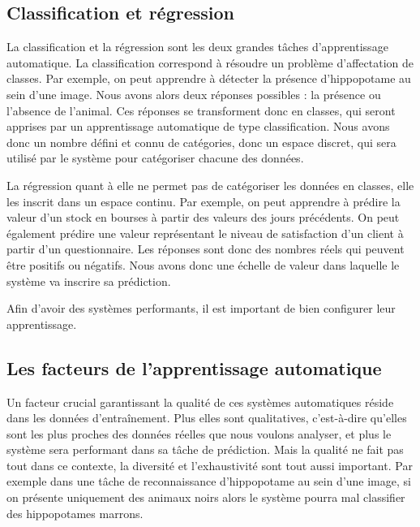 \subsection{Classification et régression}
La classification et la régression sont les deux grandes tâches d'apprentissage automatique.
La classification correspond à résoudre un problème d'affectation de classes. Par exemple, on peut apprendre à détecter la présence d'hippopotame au sein d'une image. Nous avons alors deux réponses possibles : la présence ou l'absence de l'animal. Ces réponses se transforment donc en classes, qui seront apprises par un apprentissage automatique de type classification. Nous avons donc un nombre défini et connu de catégories, donc un espace discret, qui sera utilisé par le système pour catégoriser chacune des données.

La régression quant à elle ne permet pas de catégoriser les données en classes, elle les inscrit dans un espace continu. Par exemple, on peut apprendre à  prédire la valeur d'un stock en bourses à partir des valeurs des jours précédents. On peut également prédire une valeur représentant le niveau de satisfaction d'un client à partir d'un questionnaire. Les réponses sont donc des nombres réels qui peuvent être positifs ou négatifs. Nous avons donc une échelle de valeur dans laquelle le système va inscrire sa prédiction.

%


Afin d'avoir des systèmes performants, il est important de bien configurer leur apprentissage.

\subsection{Les facteurs de l'apprentissage automatique}
Un facteur crucial garantissant la qualité de ces systèmes automatiques réside dans les données d’entraînement. Plus elles sont qualitatives, c'est-à-dire qu'elles sont les plus proches des données réelles que nous voulons analyser, et plus le système sera performant dans sa tâche de prédiction. Mais la qualité ne fait pas tout dans ce contexte, la diversité et l'exhaustivité sont tout aussi important. Par exemple dans une tâche de reconnaissance d'hippopotame au sein d'une image, si on présente uniquement des animaux noirs alors le système pourra mal classifier des hippopotames marrons.

